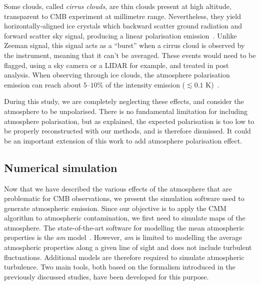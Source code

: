 \documentclass[../../thesis.tex]{subfiles}
\begin{document}
Some clouds, called \emph{cirrus clouds}, are thin clouds present at high altitude, transparent to CMB experiment at millimetre range. Nevertheless, they yield horizontally-aligned ice crystals which backward scatter ground radiation and forward scatter sky signal, producing a linear polarisation emission~\cite{li2023}. Unlike Zeeman signal, this signal acts as a \enquote{burst} when a cirrus cloud is observed by the instrument, meaning that it can't be averaged. These events would need to be flagged, using a sky camera or a LIDAR for example, and treated in post analysis. When observing through ice clouds, the atmosphere polarisation emission can reach about $5$--$10\%$ of the intensity emission ($\lesssim 0.1$ K)~\cite{takakura2019}.

During this study, we are completely neglecting these effects, and consider the atmosphere to be unpolarised. There is no fundamental limitation for including atmosphere polarisation, but as explained, the expected polarisation is too low to be properly reconstructed with our methods, and is therefore dismissed. It could be an important extension of this work to add atmosphere polarisation effect.

\subsection{Numerical simulation}

Now that we have described the various effects of the atmosphere that are problematic for CMB observations, we present the simulation software used to generate atmospheric emission. Since our objective is to apply the CMM algorithm to atmospheric contamination, we first need to simulate maps of the atmosphere.
The state-of-the-art software for modelling the mean atmospheric properties is the \emph{am} model~\cite{paine2024}. However, \emph{am} is limited to modelling the average atmospheric properties along a given line of sight and does not include turbulent fluctuations. Additional models are therefore required to simulate atmospheric turbulence. Two main tools, both based on the formalism introduced in the previously discussed studies, have been developed for this purpose.
\end{document}
